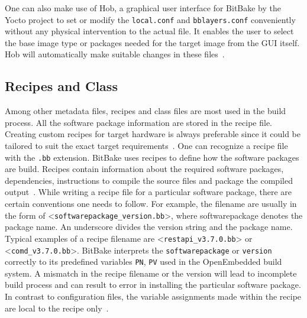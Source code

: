 One can also make use of Hob, a graphical user interface for BitBake by the Yocto project to set or modify the \texttt{local.conf} and \texttt{bblayers.conf} conveniently without any physical intervention to the actual file. It enables the user to select the base image type or packages needed for the target image from the \ac{GUI} itself. Hob will automatically make suitable changes in these files~\parencite{swain2015design}. 
\subsection{Recipes and Class} \label{section:recipes}

Among other metadata files, recipes and class files are most used in the build process. All the software package information are stored in the recipe file. Creating custom recipes for  target hardware is always preferable since it could be tailored to suit the exact target requirements~\parencite{swain2015design}. One can recognize a recipe file with the \texttt{.bb} extension. BitBake uses recipes to define how the software packages are build. Recipes contain information about the required software packages, dependencies, instructions to compile the source files and package the compiled output~\parencite{veromannembedded}. While writing a recipe file for a particular software package, there are certain conventions one needs to follow. For example, the filename are usually in the form of <\texttt{softwarepackage\_version.bb}>, where softwarepackage denotes the package name. An underscore divides the version string and the package name. Typical examples of a recipe filename are <\texttt{restapi\_v3.7.0.bb}> or <\texttt{comd\_v3.7.0.bb}>. BitBake interprets the \texttt{softwarepackage} or \texttt{version} correctly to its predefined variables \texttt{PN}, \texttt{PV} used in the OpenEmbedded build system. A mismatch in the recipe filename or the version will lead to incomplete build process and can result to error in installing the particular software package. In contrast to configuration files, the variable assignments made within the recipe are local to the recipe only~\parencite{ Reference1}. 




